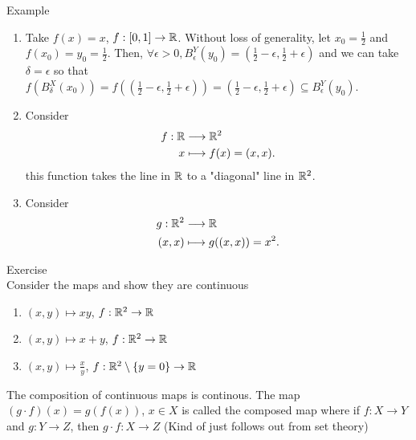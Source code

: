 \documentclass[a4paper]{article}
\begin{document}
\begin{note}{Example}\\
  \begin{enumerate}
    \item  Take $f(x) = x$,  $f: [0,1] \to \mathbb{R}$. Without loss of generality, let $x_0 = \frac{1}{2}$ and $f(x_0) = y_0 = \frac{1}{2}$. Then, $\forall \epsilon > 0, B_{\epsilon}^{Y}(y_0) = (\frac{1}{2} - \epsilon, \frac{1}{2} + \epsilon)$ and we can take $\delta = \epsilon$ so that  $f(B_{\delta}^{X} (x_0)) = f( \left( \frac{1}{2} - \epsilon, \frac{1}{2} + \epsilon \right)) = (\frac{1}{2} - \epsilon, \frac{1}{2} + \epsilon) \subseteq B_{\epsilon}^{Y} (y_0) $.
    \item Consider 
      \begin{align*}
        f : \mathbb{R} &\longrightarrow \mathbb{R}^{2} \\
        x &\longmapsto f (x) = (x,x) 
      .\end{align*}
      this function takes the line in  $\mathbb{R}$ to a "diagonal" line in $\mathbb{R}^{2}$. 
    \item Consider 
      \begin{align*}
        g: \mathbb{R}^{2} &\longrightarrow \mathbb{R} \\
        (x,x) &\longmapsto g((x,x)) = x^{2} 
      .\end{align*}
  \end{enumerate}
\end{note}

\begin{remark}{Exercise}\\
  Consider the maps and show they are continuous
  \begin{enumerate}
    \item $\left( x,y \right) \longmapsto xy$, $f: \mathbb{R}^{2} \to \mathbb{R}$ 
    \item $\left( x,y \right) \longmapsto x+y$, $f: \mathbb{R}^{2} \to \mathbb{R}$
    \item $\left( x,y \right) \longmapsto \frac{x}{y}$, $f: \mathbb{R}^{2} \setminus \{y=0\} \to \mathbb{R} $
  \end{enumerate}
\end{remark}

\begin{theorem}
  The composition of continuous maps is continous. The map  $(g \cdot f)(x) = g(f(x))$,  $x \in X$ is called the composed map where if $f: X \to Y$ and  $g: Y \to Z$, then $g \cdot f: X \to Z$ (Kind of just  follows out from set theory)
\end{theorem}
\end{document}
